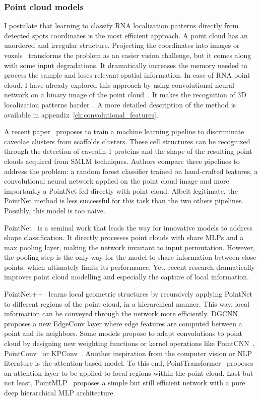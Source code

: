 \subsubsection{Point cloud models}

I postulate that learning to classify RNA localization patterns directly from detected spots coordinates is the most efficient approach.
A point cloud has an unordered and irregular structure.
Projecting the coordinates into images or voxels~\cite{Maturana_2015} transforms the problem as an easier vision challenge, but it comes along with some input degradations.
It dramatically increases the memory needed to process the sample and loses relevant spatial information.
In case of \ac{RNA} point cloud, I have already explored this approach by using convolutional neural network on a binary image of the point cloud~\cite{dubois_deep_2019}.
It makes the recognition of 3D localization patterns harder~\cite{dubois_deep_2019}.
A more detailed description of the method is available in appendix~\ref{ch:convolutional_features}.

A recent paper~\cite{khater_caveolae_2019} proposes to train a machine learning pipeline to discriminate caveolae clusters from scaffolds clusters.
These cell structures can be recognized through the detection of caveolin-1 proteins and the shape of the resulting point clouds acquired from \ac{SMLM} techniques.
Authors compare three pipelines to address the problem: a random forest classifier trained on hand-crafted features, a convolutional neural network applied on the point cloud image and more importantly a PointNet fed directly with point cloud.
Albeit legitimate, the PointNet method is less successful for this task than the two others pipelines.
Possibly, this model is too naive.

PointNet~\cite{Qi_2017_CVPR} is a seminal work that leads the way for innovative models to address shape classification.
It directly processes point clouds with share MLPs and a max pooling layer, making the network invariant to input permutation.
However, the pooling step is the only way for the model to share information between close points, which ultimately limits its performance.
Yet, recent research dramatically improves point cloud modelling and especially the capture of local information.

PointNet++~\cite{Qi_2017} learns local geometric structures by recursively applying PointNet to different regions of the point cloud, in a hierarchical manner.
This way, local information can be conveyed through the network more efficiently.
DGCNN~\cite{Wang_2019} proposes a new EdgeConv layer where edge features are computed between a point and its neighbors.
Some models propose to adapt convolutions to point cloud by designing new weighting functions or kernel operations like PointCNN~\cite{Li_2018}, PointConv~\cite{Wu_2019_CVPR} or KPConv~\cite{Thomas_2019_ICCV}.
Another inspiration from the computer vision or NLP literature is the attention-based model.
To this end, PointTransformer~\cite{Zhao_2021_ICCV} proposes an attention layer to be applied to local regions within the point cloud.
Last but not least, PointMLP~\cite{ma2022rethinking} proposes a simple but still efficient network with a pure deep hierarchical MLP architecture.

